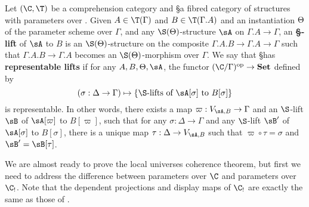 \begin{enumerate}
\begin{enumerate}
\begin{defn}\label{defn:replift-param}
  Let $(\C,\T)$ be a comprehension category and \S a fibred category of structures with parameters over \C.
  Given $A\in\T(\Gamma)$ and $B\in\T(\Gamma.A)$ and an instantiation $\Theta$ of the parameter scheme over $\Gamma$, and any $\S(\Th)$-structure $\sA$ on $\Gamma.A\to\Gamma$, an \textbf{\S-lift} of $\sA$ to $B$ is an $\S(\Th)$-structure on the composite $\Gamma.A.B\to\Gamma.A\to\Gamma$ such that $\Gamma.A.B\to\Gamma.A$ becomes an $\S(\Th)$-morphism over $\Gamma$.
  We say that \S has \textbf{representable lifts} if for any $A,B,\Th,\sA$, the functor $(\C/\Gamma)\op \to \mathbf{Set}$ defined by
  \begin{equation*}
    (\sigma:\Delta\to\Gamma) \mapsto \{ \S\text{-lifts of $\sA[\sigma]$ to $B[\sigma]$}\}
  \end{equation*}
  is representable.
  In other words, there exists a map $\varpi:V_{\sA,B}\to\Gamma$ and an $\S$-lift $\sB$ of $\sA[\varpi]$ to $B[\varpi]$, such that for any $\sigma:\Delta\to\Gamma$ and any $\S$-lift $\sB'$ of $\sA[\sigma]$ to $B[\sigma]$, there is a unique map $\tau:\Delta\to V_{\sA,B}$ such that $\varpi \circ \tau = \sigma$ and $\sB' = \sB[\tau]$.
\end{defn}

We are almost ready to prove the local universes coherence theorem, but first we need to address the difference between parameters over $\C$ and parameters over $\C_!$.
Note that the dependent projections and display maps of $\C_!$ are exactly the same as those of \C.


\end{enumerate}
\end{enumerate}
